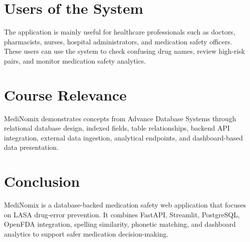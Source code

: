 \documentclass[12pt,a4paper]{article}
\begin{document}
\section{Users of the System}

The application is mainly useful for healthcare professionals such as doctors, pharmacists, nurses, hospital administrators, and medication safety officers. These users can use the system to check confusing drug names, review high-risk pairs, and monitor medication safety analytics.

\section{Course Relevance}

MediNomix demonstrates concepts from Advance Database Systems through relational database design, indexed fields, table relationships, backend API integration, external data ingestion, analytical endpoints, and dashboard-based data presentation.

\section{Conclusion}

MediNomix is a database-backed medication safety web application that focuses on LASA drug-error prevention. It combines FastAPI, Streamlit, PostgreSQL, OpenFDA integration, spelling similarity, phonetic matching, and dashboard analytics to support safer medication decision-making.
\end{document}
